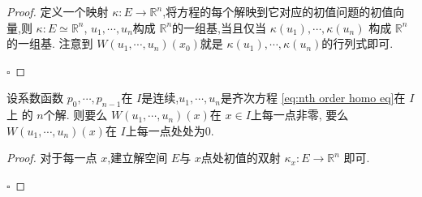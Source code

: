 \documentclass[lang=cn,12pt,color=green,fontset=none]{elegantbook}
\begin{document}
\begin{proof}
    定义一个映射 \(  \kappa :E\to \mathbb{R} ^{n}  \),将方程的每个解映到它对应的初值问题的初值向量,则 \(  \kappa: E\simeq \mathbb{R} ^{n}  \),
    \(   u_1,\cdots,u_n   \)构成 \(  \mathbb{R} ^{n}  \)的一组基,当且仅当 \(  \kappa\left( u_1 \right),\cdots ,\kappa\left( u_{n} \right)    \)    构成 \(  \mathbb{R} ^{n}  \)的一组基.
    注意到 \(  W\left(  u_1,\cdots,u_n  \right)\left( x_0 \right)    \)就是 \(  \kappa\left( u_1 \right),\cdots ,\kappa\left( u_{n} \right)    \)的行列式即可. 

    \hfill $\square$
\end{proof}

\begin{proposition}
    设系数函数 \(   p_0,\cdots,p_{n-1}   \)在 \(  I  \)是连续,\(   u_1,\cdots,u_n   \)是齐次方程 \ref{eq:nth order homo eq}在 \(  I  \)上 的 \(  n  \)个解.
    则要么 \(  W\left(  u_1,\cdots,u_n  \right)\left( x \right)    \)在 \(  x \in I  \)上每一点非零,  要么 \(  W\left(  u_1,\cdots,u_n  \right)\left( x \right)    \)在 \(  I  \)上每一点处处为0.  
\end{proposition}

\begin{proof}
    对于每一点 \(  x  \),建立解空间 \(  E  \)与 \(  x  \)点处初值的双射 \(  \kappa_{x}: E\to \mathbb{R} ^{n}  \) 即可.

    \hfill $\square$
\end{proof}
\end{document}
